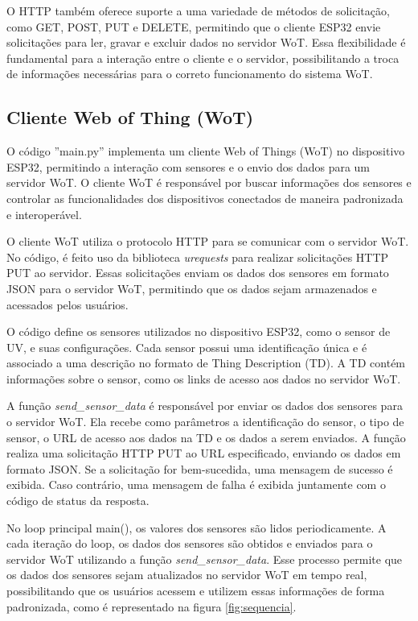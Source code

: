 O HTTP também oferece suporte a uma variedade de métodos de solicitação, como GET, POST, PUT e DELETE, permitindo que o cliente ESP32 envie solicitações para ler, gravar e excluir dados no servidor WoT. Essa flexibilidade é fundamental para a interação entre o cliente e o servidor, possibilitando a troca de informações necessárias para o correto funcionamento do sistema WoT.

\subsection{Cliente Web of Thing (WoT)}

O código ''main.py''  implementa um cliente Web of Things (WoT) no dispositivo ESP32, permitindo a interação com sensores e o envio dos dados para um servidor WoT. O cliente WoT é responsável por buscar informações dos sensores e controlar as funcionalidades dos dispositivos conectados de maneira padronizada e interoperável.

O cliente WoT utiliza o protocolo HTTP para se comunicar com o servidor WoT. No código, é feito uso da biblioteca \textit{urequests} para realizar solicitações HTTP PUT ao servidor. Essas solicitações enviam os dados dos sensores em formato JSON para o servidor WoT, permitindo que os dados sejam armazenados e acessados pelos usuários.

O código define os sensores utilizados no dispositivo ESP32, como o sensor de UV, e suas configurações. Cada sensor possui uma identificação única e é associado a uma descrição no formato de Thing Description (TD). A TD contém informações sobre o sensor, como os links de acesso aos dados no servidor WoT.

A função \textit{send\_sensor\_data} é responsável por enviar os dados dos sensores para o servidor WoT. Ela recebe como parâmetros a identificação do sensor, o tipo de sensor, o URL de acesso aos dados na TD e os dados a serem enviados. A função realiza uma solicitação HTTP PUT ao URL especificado, enviando os dados em formato JSON. Se a solicitação for bem-sucedida, uma mensagem de sucesso é exibida. Caso contrário, uma mensagem de falha é exibida juntamente com o código de status da resposta.

No loop principal main(), os valores dos sensores são lidos periodicamente. A cada iteração do loop, os dados dos sensores são obtidos e enviados para o servidor WoT utilizando a função \textit{send\_sensor\_data}. Esse processo permite que os dados dos sensores sejam atualizados no servidor WoT em tempo real, possibilitando que os usuários acessem e utilizem essas informações de forma padronizada, como é representado na figura \ref{fig:sequencia}.

